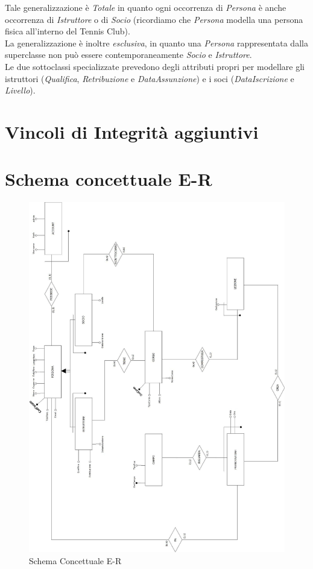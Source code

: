 Tale generalizzazione è \textit{Totale} in quanto ogni occorrenza di \textit{Persona} è anche occorrenza di \textit{Istruttore} o di \textit{Socio} (ricordiamo che \textit{Persona} modella una persona fisica all'interno del Tennis Club).\\
La generalizzazione è inoltre \textit{esclusiva}, in quanto una \textit{Persona} rappresentata dalla superclasse non può essere contemporaneamente \textit{Socio} e \textit{Istruttore}.\\

Le due sottoclassi specializzate prevedono degli attributi propri per modellare gli istruttori (\textit{Qualifica}, \textit{Retribuzione} e \textit{DataAssunzione}) e i soci (\textit{DataIscrizione} e \textit{Livello}).

\section{Vincoli di Integrità aggiuntivi}
\section{Schema concettuale E-R}
\begin{figure}[H]
 \centering
  \includegraphics[width=\textwidth, height=\textheight]{images/ER_FINALE.jpg}
\caption{Schema Concettuale E-R}
\end{figure}